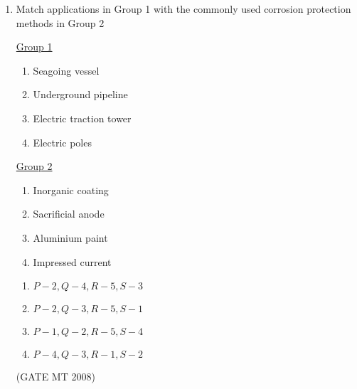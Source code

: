\documentclass[11pt, letterpaper]{article}
\theoremstyle{remark}
\begin{document}
\begin{enumerate}[label=Q.\arabic*]
\item Match applications in Group 1 with the commonly used corrosion protection methods in Group 2
\begin{multicols}{2}
    \underline{Group 1}
    \begin{enumerate}[label=(\Alph*), start=16]
        \item Seagoing vessel
        \item Underground pipeline
        \item Electric traction tower
        \item Electric poles
    \end{enumerate}

     \underline{Group 2}
    \begin{enumerate}[label=(\arabic*), start=1]
        \item Inorganic coating
        \item Sacrificial anode
        \item Aluminium paint
        \item Impressed current
    \end{enumerate}
\end{multicols}
\vspace{-2em}
    \begin{multicols}{2}
        \begin{enumerate}[label=(\MakeUppercase{\alph*})]
            \item $P-2, Q-4, R-5, S-3$
            \item $P-2, Q-3, R-5, S-1$
            \item $P-1, Q-2, R-5, S-4$
            \item $P-4, Q-3, R-1, S-2$
        \end{enumerate}
    \end{multicols}
   \hfill(GATE MT 2008) 
    

\end{enumerate}
\end{document}
